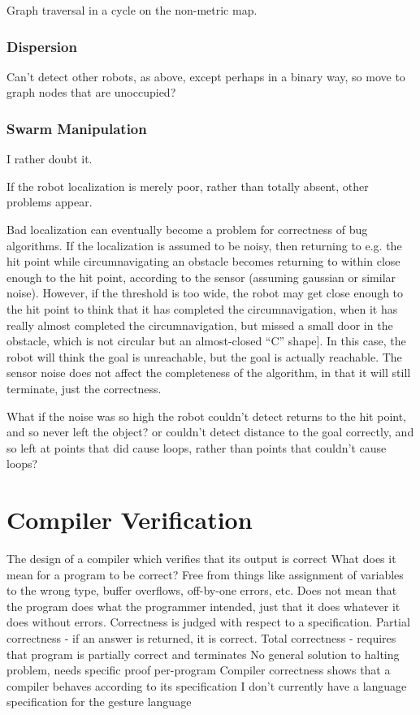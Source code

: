 Graph traversal in a cycle on the non-metric map. 

\subsection{Dispersion}

Can't detect other robots, as above, except perhaps in a binary way, so move to graph nodes that are unoccupied?

\subsection{Swarm Manipulation}

I rather doubt it. 

If the robot localization is merely poor, rather than totally absent, other problems appear. 

Bad localization can eventually become a problem for correctness of bug algorithms. If the localization is assumed to be noisy, then returning to e.g. the hit point while circumnavigating an obstacle becomes returning to within close enough to the hit point, according to the sensor (assuming gaussian or similar noise). However, if the threshold is too wide, the robot may get close enough to the hit point to think that it has completed the circumnavigation, when it has really almost completed the circumnavigation, but missed a small door in the obstacle, which is not circular but an almost-closed ``C'' shape]. 
In this case, the robot will think the goal is unreachable, but the goal is actually reachable. 
The sensor noise does not affect the completeness of the algorithm, in that it will still terminate, just the correctness. 

What if the noise was so high the robot couldn't detect returns to the hit point, and so never left the object? or couldn't detect distance to the goal correctly, and so left at points that did cause loops, rather than points that couldn't cause loops?


\chapter{Compiler Verification}

The design of a compiler which verifies that its output is correct What does it mean for a program to be correct? Free from things like assignment of variables to the wrong type, buffer overflows, off-by-one errors, etc. Does not mean that the program does what the programmer intended, just that it does whatever it does without errors. 
Correctness is judged with respect to a specification. 
Partial correctness - if an answer is returned, it is correct. 
Total correctness - requires that program is partially correct and terminates
No general solution to halting problem, needs specific proof per-program
Compiler correctness shows that a compiler behaves according to its specification
I don't currently have a language specification for the gesture language 

